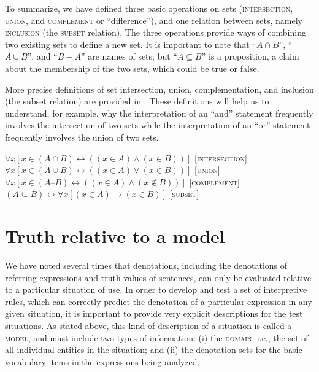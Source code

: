 To summarize, we have defined three basic operations on sets (\textsc{intersection}, \textsc{union}, and \textsc{complement} or “difference”), and one relation between sets, namely \textsc{inclusion} (the \textsc{subset} relation). The three operations provide ways of combining two existing sets to define a new set. It is important to note that “$A\cap B$”, “$A\cup B$”, and “$B-A$” are names of sets; but “$A\subseteq B$” is a proposition, a claim about the membership of the two sets, which could be true or false.



More precise definitions of set intersection, union, complementation, and inclusion (the subset relation) are provided in . These definitions will help us to understand, for example, why the interpretation of an “and” statement frequently involves the intersection of two sets while the interpretation of an “or” statement frequently involves the union of two sets.


\ea \label{extab:13.19}
$\forall x [x \in (A\cap B) \leftrightarrow ((x \in A) \wedge  (x \in B))]$ \hfill [\textsc{intersection}]\\
$\forall x [x \in (A\cup B) \leftrightarrow ((x \in A) \vee    (x \in B))]$ \hfill [\textsc{union}]\\
$\forall x [x \in (A–B)     \leftrightarrow ((x \in A) \wedge  (x \notin B))]$ \hfill [\textsc{complement}]\\
$(A \subseteq B)            \leftrightarrow \forall x [(x \in A) \rightarrow (x \in B)]$ \hfill [\textsc{subset}]
\z

\section{Truth relative to a model}\label{sec:13.4}

We have noted several times that denotations, including the denotations of referring expressions and truth values of sentences, can only be evaluated relative to a particular situation of use. In order to develop and test a set of interpretive rules, which can correctly predict the denotation of a particular expression in any given situation, it is important to provide very explicit descriptions for the test situations. As stated above, this kind of description of a situation is called a \textsc{model}, and must include two types of information: (i) the \textsc{domain}, i.e., the set of all individual entities in the situation; and (ii) the denotation sets for the basic vocabulary items in the expressions being analyzed.



